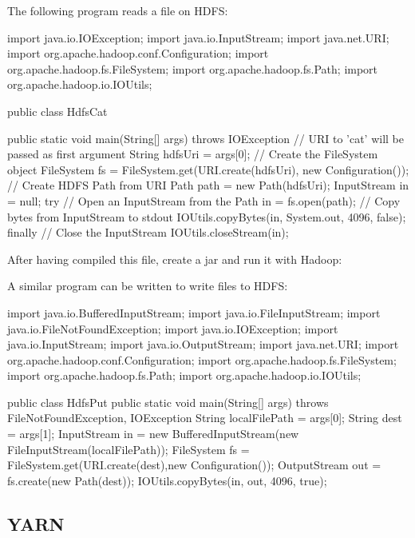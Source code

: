 \documentclass[11pt]{article}
\begin{document}
The following program reads a file on HDFS:
\begin{java}
import java.io.IOException;
import java.io.InputStream;
import java.net.URI;
import org.apache.hadoop.conf.Configuration;
import org.apache.hadoop.fs.FileSystem;
import org.apache.hadoop.fs.Path;
import org.apache.hadoop.io.IOUtils;


public class HdfsCat {

    public static void main(String[] args) throws IOException {
        // URI to 'cat' will be passed as first argument
        String hdfsUri = args[0];
        // Create the FileSystem object
        FileSystem fs = FileSystem.get(URI.create(hdfsUri), new Configuration());
        // Create HDFS Path from URI
        Path path = new Path(hdfsUri);
        InputStream in = null;
        try{
            // Open an InputStream from the Path
            in = fs.open(path);
            // Copy bytes from InputStream to stdout
            IOUtils.copyBytes(in, System.out, 4096, false);
        } finally{
            // Close the InputStream
            IOUtils.closeStream(in);
        }
    }  
}
\end{java}
After having compiled this file, create a jar and run it with Hadoop:
A similar program can be written to write files to HDFS:
\begin{java}
import java.io.BufferedInputStream;
import java.io.FileInputStream;
import java.io.FileNotFoundException;
import java.io.IOException;
import java.io.InputStream;
import java.io.OutputStream;
import java.net.URI;
import org.apache.hadoop.conf.Configuration;
import org.apache.hadoop.fs.FileSystem;
import org.apache.hadoop.fs.Path;
import org.apache.hadoop.io.IOUtils;


public class HdfsPut {
  public static void main(String[] args) throws FileNotFoundException, IOException{
      String localFilePath = args[0];
      String dest = args[1];
      InputStream in = new BufferedInputStream(new FileInputStream(localFilePath));
      FileSystem fs = FileSystem.get(URI.create(dest),new Configuration());
      OutputStream out = fs.create(new Path(dest));
      IOUtils.copyBytes(in, out, 4096, true);
  }
}
\end{java}


\subsection{YARN}
\end{document}
